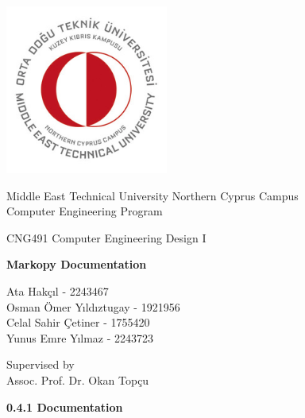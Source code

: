 \let\mypdfximage\pdfximage\def\pdfximage{\immediate\mypdfximage}\documentclass[twoside]{book}
\newcommand{\+}{\discretionary{\mbox{\scriptsize$\hookleftarrow$}}{}{}}
\begin{document}
\hypersetup{pageanchor=false,
             bookmarksnumbered=true,
             pdfencoding=unicode
            }
\begin{titlepage}
\begin{center}
    
    \includegraphics[width=0.4\textwidth]{university}
        
    \Large
    Middle East Technical University Northern Cyprus Campus\\
    Computer Engineering Program\\
    
    \vspace{2cm}
    
    CNG491 Computer Engineering Design I
    
    \vspace{2cm}
    
    \Large
    \textbf{Markopy Documentation}
    
    \vspace{2cm}
    
    \large   
    Ata Hakçıl - 2243467\\
    Osman Ömer Yıldıztugay - 1921956\\ 
    Celal Sahir Çetiner - 1755420\\
    Yunus Emre Yılmaz - 2243723\\

    
    \vspace{2cm}
    
    \large   
    Supervised by\\
    Assoc. Prof. Dr. Okan Topçu\\
    
    \vfill
        
    \large
    
    \textbf{0.4.1 Documentation}
    
\end{center}
\end{titlepage}
\tableofcontents
{}
\hypersetup{pageanchor=true}
\end{document}
